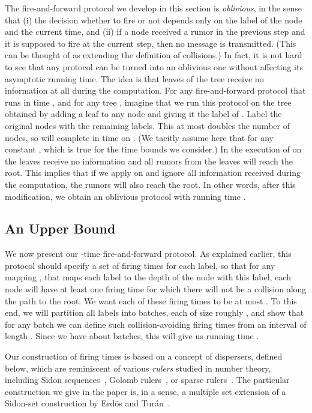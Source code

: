 The fire-and-forward protocol we develop in this section is \emph{oblivious}, in the sense that
(i) the decision whether to fire or not depends only on the label of the node and the
current time, and (ii) if a node received a rumor in the previous step and it
is supposed to fire at the current step, then no message is transmitted. (This can be
thought of as extending the definition of collisions.)
In fact, it is not hard
to see that any protocol can be turned into an oblivious one without affecting its
asymptotic running time. The idea is that leaves of the tree receive no information at all
during the computation. For any fire-and-forward protocol  that runs in time , and for
any tree , imagine that we
run this protocol on the tree  obtained by adding a leaf to any
node  and giving it the label of . Label the original nodes with the remaining labels.
This at most
doubles the number of nodes, so  will complete in time  on .
(We tacitly assume here that  for any constant , which is true for the
time bounds we consider.)
In the execution of  on  the leaves receive no information and all rumors
from the leaves will reach the root. This implies that
if we apply  on  and ignore all information received during the computation,
the rumors will also reach the root. In other words, after this modification, we obtain
an oblivious protocol  with running time .



\subsection{An  Upper Bound}

We now present our -time fire-and-forward protocol. As explained earlier, this protocol 
should specify a set of firing times for each label, so that for any mapping , 
that maps each label to the depth of the node with this label,
each node will have at least one firing time for which there will not be a collision
along the path to the root. We want each of these firing times to be at most .
To this end, we will partition all labels into batches, each of size 
roughly , and show that for any batch we can define such collision-avoiding
firing times from an interval of length .
Since we have about  batches, this will give us running time .

Our construction of firing times is based on a concept of dispersers, defined below,
which are reminiscent of various \emph{rulers} studied in number theory,
including Sidon sequences~\cite{wikipedia_sidon},
Golomb rulers~\cite{wikipedia_golomb}, or sparse rulers~\cite{wikipedia_sparse}. 
The particular construction we give in the paper is, in a sense, a
multiple set extension of a Sidon-set construction 
by Erd{\"o}s and Tur{\'a}n~\cite{Erdos_Turan_41}.

